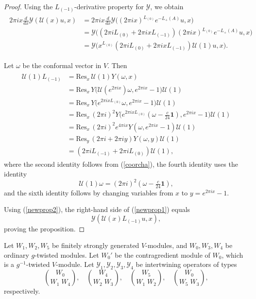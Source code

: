 \documentclass[9pt]{amsart}
\begin{document}
\begin{proof}
Using the $L_{(-1)}$-derivative property for $\mathcal{Y}$, we obtain
\begin{align}\label{newprop1}
\begin{split}
    2\pi i x \frac{d}{dx} \mathcal{Y}(\mathcal{U}(x)u, x)
    &= 2\pi i x \frac{d}{dx} \mathcal{Y}\big((2\pi i x)^{L_{(0)}} e^{-L_{+}(A)} u, x\big) \\
    &= \mathcal{Y}\big((2\pi i L_{(0)} + 2\pi i x L_{(-1)})(2\pi i x)^{L_{(0)}} e^{-L_{+}(A)} u, x\big) \\
    &= \mathcal{Y}\big(x^{L_{(0)}}(2\pi i L_{(0)} + 2\pi i x L_{(-1)}) \mathcal{U}(1) u, x\big).
\end{split}
\end{align}

Let $\omega$ be the conformal vector in $V$. Then
\begin{align}\label{newprop2}
\begin{split}
    \mathcal{U}(1)L_{(-1)} &= \text{Res}_{x} \, \mathcal{U}(1) Y(\omega, x) \\
    &= \text{Res}_{x} \, Y\big(\mathcal{U}(e^{2\pi i x}) \omega, e^{2\pi i x} - 1\big) \mathcal{U}(1) \\
    &= \text{Res}_{x} \, Y\big(e^{2\pi i x L_{(0)}} \omega, e^{2\pi i x} - 1\big) \mathcal{U}(1) \\
    &= \text{Res}_{x} \, (2\pi i)^2 Y\big(e^{2\pi i x L_{(0)}} (\omega - \tfrac{c}{24} \mathbf{1}), e^{2\pi i x} - 1\big) \mathcal{U}(1) \\
    &= \text{Res}_{x} \, (2\pi i)^2 e^{4\pi i x} Y(\omega, e^{2\pi i x} - 1) \mathcal{U}(1) \\
    &=\text{Res}_{y} \, (2\pi i + 2\pi i y) Y(\omega, y) \mathcal{U}(1) \\
    &= (2\pi i L_{(-1)} + 2\pi i L_{(0)}) \mathcal{U}(1),
\end{split}
\end{align}
where the second identity follows from (\ref{coorcha}), the fourth identity uses the identity 
\[
\mathcal{U}(1) \omega = (2\pi i)^2 \left(\omega - \tfrac{c}{24} \mathbf{1} \right),
\]
and the sixth identity follows by changing variables from $x$ to $y = e^{2\pi i x} - 1$.

Using (\ref{newprop2}), the right-hand side of (\ref{newprop1}) equals
\[
\mathcal{Y}(\mathcal{U}(x)L_{(-1)}u, x),
\]
proving the proposition.
\end{proof}

Let $W_1, W_2, W_5$ be finitely strongly generated $V$-modules, and $W_0, W_3, W_4$ be ordinary $g$-twisted modules. Let $W_0'$ be the contragredient module of $W_0$, which is a $g^{-1}$-twisted $V$-module. Let $\mathcal{Y}_1, \mathcal{Y}_2, \mathcal{Y}_3, \mathcal{Y}_4$ be intertwining operators of types
\[
\binom{W_0}{W_1 \; W_4},\quad \binom{W_4}{W_2 \; W_3},\quad \binom{W_5}{W_1 \; W_2},\quad \binom{W_0}{W_5 \; W_3},
\]
respectively.
\end{document}
